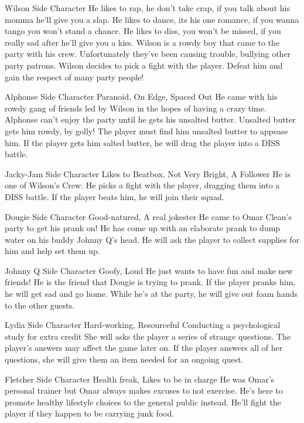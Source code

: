 {Wilson}
{Side Character}
{He likes to rap, he don't take crap, if you talk about his momma he'll give you a slap. He likes to dance, its his one romance, if you wanna tango you won't stand a chance. He likes to diss, you won't be missed, if you really sad after he'll give you a kiss.}
{Wilson is a rowdy boy that came to the party with his crew. Unfortunately they've been causing trouble, bullying other party patrons.}
{Wilson decides to pick a fight with the player. Defeat him and gain the respect of many party people!}

{Alphonse}
{Side Character}
{Paranoid, On Edge, Spaced Out}
{He came with his rowdy gang of friends led by Wilson in the hopes of having a crazy time.}
{Alphonse can't enjoy the party until he gets his unsalted butter. Unsalted butter gets him rowdy, by golly! The player must find him unsalted butter to appease him. If the player gets him salted butter, he will drag the player into a DISS battle.}

{Jacky-Jam}
{Side Character}
{Likes to Beatbox, Not Very Bright, A Follower}
{He is one of Wilson's Crew.}
{He picks a fight with the player, dragging them into a DISS battle. If the player beats him, he will join their squad.}

{Dougie}
{Side Character}
{Good-natured, A real jokester}
{He came to Omar Clean's party to get his prank on!}
{He has come up with an elaborate prank to dump water on his buddy Johnny Q's head. He will ask the player to collect supplies for him and help set them up.}

{Johnny Q}
{Side Character}
{Goofy, Loud}
{He just wants to have fun and make new friends!}
{He is the friend that Dougie is trying to prank. If the player pranks him, he will get sad and go home. While he's at the party, he will give out foam hands to the other guests.}

{Lydia}
{Side Character}
{Hard-working, Resourceful}
{Conducting a psychological study for extra credit}
{She will asks the player a series of strange questions. The player's answers may affect the game later on. If the player answers all of her questions, she will give them an item needed for an ongoing quest.}

{Fletcher}
{Side Character}
{Health freak, Likes to be in charge}
{He was Omar's personal trainer but Omar always makes excuses to not exercise. He's here to promote healthy lifestyle choices to the general public instead.}
{He'll fight the player if they happen to be carrying junk food.}

